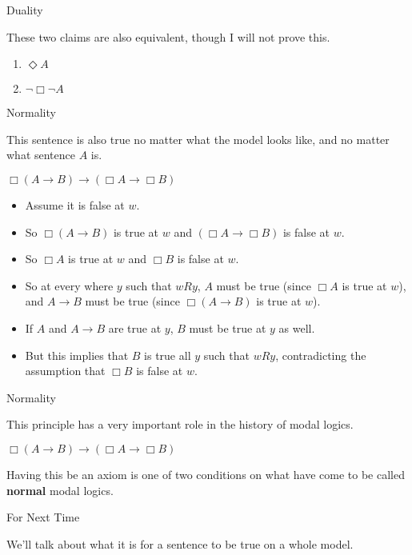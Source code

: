 \documentclass[
  ignorenonframetext,
]{beamer}
\providecommand{\tightlist}{%
  \setlength{\itemsep}{0pt}\setlength{\parskip}{0pt}}
\renewcommand{\,}{\text{, }}
\renewenvironment*{quote}	
	{\list{}{\rightmargin   \leftmargin} \item } 	
	{\endlist }
\begin{document}
\begin{frame}{Duality}
\protect\hypertarget{duality-2}{}

These two claims are also equivalent, though I will not prove this.

\begin{enumerate}
\tightlist
\item
  \(\Diamond A\)
\item
  \(\neg \Box \neg A\)
\end{enumerate}

\end{frame}

\begin{frame}{Normality}
\protect\hypertarget{normality}{}

This sentence is also true no matter what the model looks like, and no
matter what sentence \(A\) is.

\begin{quote}
\(\Box (A \rightarrow B) \rightarrow (\Box A \rightarrow \Box B)\)
\end{quote}

\begin{itemize}
\tightlist
\item
  Assume it is false at \(w\).
\item
  So \(\Box (A \rightarrow B)\) is true at \(w\) and
  \((\Box A \rightarrow \Box B)\) is false at \(w\).
\item
  So \(\Box A\) is true at \(w\) and \(\Box B\) is false at \(w\).
\item
  So at every where \(y\) such that \(wRy\), \(A\) must be true (since
  \(\Box A\) is true at \(w\)), and \(A \rightarrow B\) must be true
  (since \(\Box(A \rightarrow B)\) is true at \(w\)).
\item
  If \(A\) and \(A \rightarrow B\) are true at \(y\), \(B\) must be true
  at \(y\) as well.
\item
  But this implies that \(B\) is true all \(y\) such that \(wRy\),
  contradicting the assumption that \(\Box B\) is false at \(w\).
\end{itemize}

\end{frame}

\begin{frame}{Normality}
\protect\hypertarget{normality-1}{}

This principle has a very important role in the history of modal logics.

\begin{quote}
\(\Box (A \rightarrow B) \rightarrow (\Box A \rightarrow \Box B)\)
\end{quote}

Having this be an axiom is one of two conditions on what have come to be
called \textbf{normal} modal logics.

\end{frame}

\begin{frame}{For Next Time}
\protect\hypertarget{for-next-time}{}

We'll talk about what it is for a sentence to be true on a whole model.

\end{frame}
\end{document}
